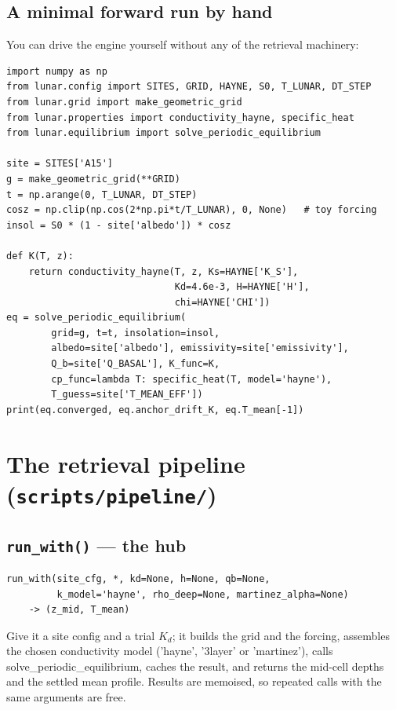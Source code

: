 \documentclass[11pt]{report}
\newcommand{\code}[1]{{\ttfamily\small #1}}
\begin{document}
\section{A minimal forward run by hand}

You can drive the engine yourself without any of the retrieval machinery:

\begin{lstlisting}[style=py]
import numpy as np
from lunar.config import SITES, GRID, HAYNE, S0, T_LUNAR, DT_STEP
from lunar.grid import make_geometric_grid
from lunar.properties import conductivity_hayne, specific_heat
from lunar.equilibrium import solve_periodic_equilibrium

site = SITES['A15']
g = make_geometric_grid(**GRID)
t = np.arange(0, T_LUNAR, DT_STEP)
cosz = np.clip(np.cos(2*np.pi*t/T_LUNAR), 0, None)   # toy forcing
insol = S0 * (1 - site['albedo']) * cosz

def K(T, z):
    return conductivity_hayne(T, z, Ks=HAYNE['K_S'],
                              Kd=4.6e-3, H=HAYNE['H'],
                              chi=HAYNE['CHI'])
eq = solve_periodic_equilibrium(
        grid=g, t=t, insolation=insol,
        albedo=site['albedo'], emissivity=site['emissivity'],
        Q_b=site['Q_BASAL'], K_func=K,
        cp_func=lambda T: specific_heat(T, model='hayne'),
        T_guess=site['T_MEAN_EFF'])
print(eq.converged, eq.anchor_drift_K, eq.T_mean[-1])
\end{lstlisting}

\chapter{The retrieval pipeline (\texttt{scripts/pipeline/})}

\section{\texttt{run\_with()} --- the hub}

\begin{lstlisting}[style=py]
run_with(site_cfg, *, kd=None, h=None, qb=None,
         k_model='hayne', rho_deep=None, martinez_alpha=None)
    -> (z_mid, T_mean)
\end{lstlisting}

Give it a site config and a trial $K_d$; it builds the grid and the
forcing, assembles the chosen conductivity model
(\code{'hayne'}, \code{'3layer'} or \code{'martinez'}), calls
\code{solve\_periodic\_equilibrium}, caches the result, and returns the
mid-cell depths and the settled mean profile. Results are memoised, so
repeated calls with the same arguments are free.
\end{document}

